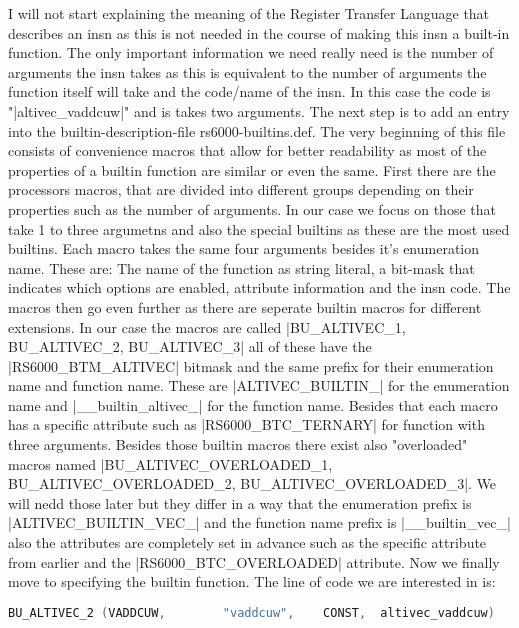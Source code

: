 I will not start explaining the meaning of the Register Transfer Language that describes an insn as this is not needed in the course of making this insn a built-in function.
The only important information we need really need is the number of arguments the insn takes as this is equivalent to the number of arguments the function itself will take and the code/name of the insn. In this case the code is "|altivec_vaddcuw|" and is takes two arguments.
The next step is to add an entry into the builtin-description-file rs6000-builtins.def. The very beginning of this file consists of convenience macros that allow for better readability as most of the properties of a builtin function are similar or even the same. First there are the processors macros, that are divided into different groups depending on their properties such as the number of arguments. In our case we focus on those that take 1 to three argumetns and also the special builtins as these are the most used builtins. Each macro takes the same four arguments besides it's enumeration name. These are: The name of the function as string literal, a bit-mask that indicates which options are enabled, attribute information and the insn code.
The macros then go even further as there are seperate builtin macros for different extensions. In our case the macros are called |BU_ALTIVEC_1, BU_ALTIVEC_2, BU_ALTIVEC_3| all of these have the |RS6000_BTM_ALTIVEC| bitmask and the same prefix for their enumeration name and function name. These are |ALTIVEC_BUILTIN_| for the enumeration name and |__builtin_altivec_| for the function name. Besides that each macro has a specific attribute such as |RS6000_BTC_TERNARY| for function with three arguments.
Besides those builtin macros there exist also "overloaded" macros named |BU_ALTIVEC_OVERLOADED_1, BU_ALTIVEC_OVERLOADED_2, BU_ALTIVEC_OVERLOADED_3|. We will nedd those later but they differ in a way that the enumeration prefix is |ALTIVEC_BUILTIN_VEC_| and the function name prefix is |__builtin_vec_| also the attributes are completely set in advance such as the specific attribute from earlier and the |RS6000_BTC_OVERLOADED| attribute.
Now we finally move to specifying the builtin function. The line of code we are interested in is:

\begin{lstlisting}[language=C++,basicstyle=\ttfamily\scriptsize,keywordstyle=\color{red}]
BU_ALTIVEC_2 (VADDCUW,	      "vaddcuw",	CONST,	altivec_vaddcuw)
\end{lstlisting}

